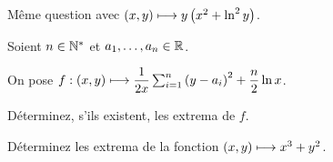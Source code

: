 \begin{exo}
Même question avec \(\left(x,y\right)\longmapsto y\left(x^2+\ln^2y\right)\).
\end{exo}

\begin{exo}
Soient \(n\in\mathbb{N}^*\) et \(a_1,\dots,a_n\in\mathbb{R}\).

On pose \(f:\left(x,y\right)\longmapsto\dfrac{1}{2x}\sum_{i=1}^n\left(y-a_i\right)^2+\dfrac{n}{2}\ln x\).

Déterminez, s'ils existent, les extrema de \(f\).
\end{exo}

\begin{exo}
Déterminez les extrema de la fonction \(\left(x,y\right)\longmapsto x^3+y^2\).
\end{exo}
